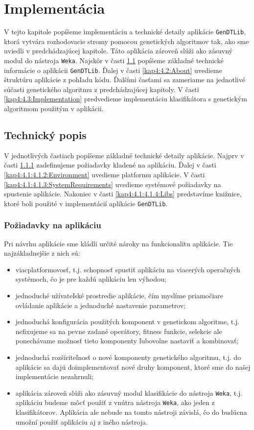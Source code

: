 \chapter{Implementácia}\label{kap4:Implementation}
V tejto kapitole popíšeme implementáciu a technické detaily aplikácie \verb|GenDTLib|, ktorá vytvára rozhodovacie stromy pomocou genetických algoritmov tak, ako sme uviedli v predchádzajúcej kapitole. Táto aplikácia zároveň slúži ako zásuvný modul do nástroja \verb|Weka|. Najskôr v časti \ref{kap4:4.1:Info} popíšeme základné technické informácie o aplikácii \verb|GenDTLib|. Ďalej v časti \ref{kap4:4.2:About} uvedieme štruktúru aplikácie z pohľadu kódu. Ďalšími časťami sa zameriame na jednotlivé súčasti genetického algoritmu z predchádzajúcej kapitoly. V časti \ref{kap4:4.3:Implementation} predvedieme implementáciu klasifikátora s genetickým algoritmom použitým v aplikácii.
\section{Technický popis}\label{kap4:4.1:Info}
V jednotlivých častiach popíšeme základné technické detaily aplikácie. Najprv v časti \ref{kap4:4.1:4.1.1:Requirements} zadefinujeme požiadavky kladené na aplikáciu. Ďalej v časti \ref{kap4:4.1:4.1.2:Environment} uvedieme platformu aplikácie. V časti \ref{kap4:4.1:4.1.3:SystemRequirements} uvedieme systémové požiadavky na spustenie aplikácie. Nakoniec v časti \ref{kap4:4.1:4.1.4:Libs} predstavíme knižnice, ktoré boli použité v implementácií aplikácie \verb|GenDTLib|.

\subsection{Požiadavky na aplikáciu}\label{kap4:4.1:4.1.1:Requirements}
Pri návrhu aplikácie sme kládli určité nároky na funkcionalitu aplikácie. Tie najzákladnejšie z nich sú:
\begin{itemize}
\item viacplatformovosť, t.j. schopnosť spustiť aplikáciu na viacerých operačných systémoch, čo je pre každú aplikáciu len výhodou;
\item jednoduché užívateľské prostredie aplikácie, čím myslíme priamočiare ovládanie aplikácie a jednoduché nastavenie parametrov;
\item jednoduchá konfigurácia použitých komponent v genetickom algoritme, t.j. nefixujeme sa na pevne zadané operátory, fitness funkcie, selekcie ale ponechávame možnosť tieto komponenty ľubovolne nastaviť a kombinovať;
\item jednoduchá rozšíriteľnosť o nové komponenty genetického algoritmu, t.j. do aplikácie sa dajú doimplementovať nové druhy komponent, ktoré sme do našej implementácie nezahrnuli;
\item aplikácia zároveň slúži ako zásuvný modul klasifikácie do nástroja \verb|Weka|, t.j. aplikáciu budeme môcť použiť z vnútra nástroja \verb|Weka|, ako jeden z klasifikátorov. Aplikácia ale nebude na tomto nástroji závislá, čo do budúcna umožní použiť aplikáciu aj z iného nástroja.
\end{itemize}

